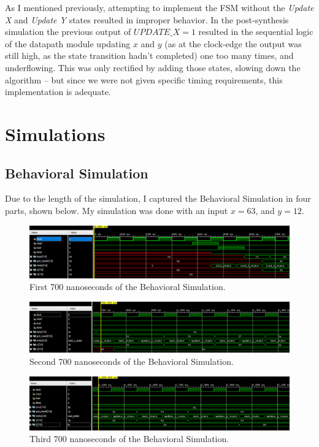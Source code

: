 \documentclass[a4paper, 12pt]{article}
\begin{document}
As I mentioned previously, attempting to implement the FSM without the \textit{Update X} and \textit{Update Y} states resulted in improper behavior. In the post-synthesis simulation the previous output of $UPDATE\_X=1$ resulted in the sequential logic of the datapath module updating $x$ and $y$ (as at the clock-edge the output was still high, as the state transition hadn't completed) one too many times, and underflowing. This was only rectified by adding those states, slowing down the algorithm -- but since we were not given specific timing requirements, this implementation is adequate.

\section{Simulations}
\subsection{Behavioral Simulation}
Due to the length of the simulation, I captured the Behavioral Simulation in four parts, shown below. My simulation was done with an input $x=63$, and $y=12$.

\begin{figure}[H]
\centering
\includegraphics[width=\textwidth]{Project_2/Outputs/Sim1.PNG}
\caption{First 700 nanoseconds of the Behavioral Simulation.}
\label{fig:behav-sim1}
\end{figure}

\begin{figure}[H]
\centering
\includegraphics[width=\textwidth]{Project_2/Outputs/Sim2.PNG}
\caption{Second 700 nanoseconds of the Behavioral Simulation.}
\label{fig:behav-sim2}
\end{figure}

\begin{figure}[H]
\centering
\includegraphics[width=\textwidth]{Project_2/Outputs/Sim3.PNG}
\caption{Third 700 nanoseconds of the Behavioral Simulation.}
\label{fig:behav-sim3}
\end{figure}
\end{document}
